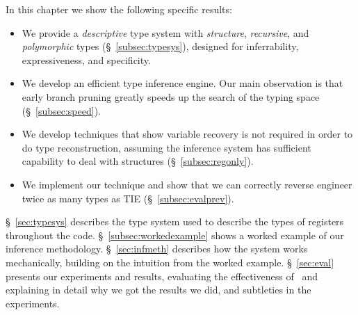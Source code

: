 In this chapter we show the following specific results:
\begin{itemize}
\item We provide a \emph{descriptive} type system with \emph{structure}, \emph {recursive}, and \emph{polymorphic} types (\S~\ref{subsec:typesys}), designed for inferrability, expressiveness, and specificity.
\item We develop an efficient type inference engine. Our main observation is that early branch pruning greatly speeds up the search of the typing space (\S~\ref{subsec:speed}).
\item We develop techniques that show variable recovery is not required in order to do type reconstruction, assuming the inference system has sufficient capability to deal with structures (\S~\ref{subsec:regonly}).
\item We implement our technique and show that we can correctly reverse engineer twice as many types as TIE (\S~\ref{subsec:evalprev}).
\end{itemize}

\S~\ref{sec:typesys} describes the type system used to describe the types of registers throughout the code. \S~\ref{subsec:workedexample} shows a worked example of our inference methodology. \S~\ref{sec:infmeth} describes how the system works mechanically, building on the intuition from the worked example. \S~\ref{sec:eval} presents our experiments and results, evaluating the effectiveness of \bitr\ and explaining in detail why we got the results we did, and subtleties in the experiments.
